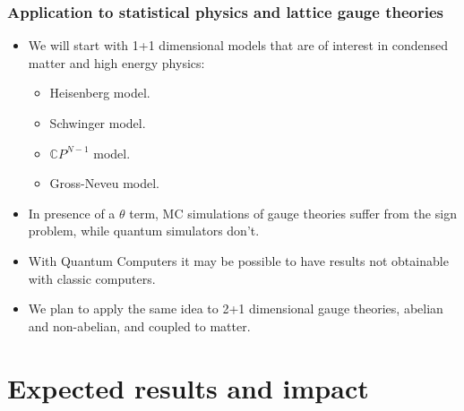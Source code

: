 \documentclass[10pt,t,xcolor=dvipsnames,aspectratio=169]{beamer}
\begin{document}
\begin{frame}
    \frametitle{Application to statistical physics and lattice gauge theories}
    \begin{itemize}
        \item
            We will start with 1+1 dimensional models that are of interest in condensed matter and high energy physics:
            \begin{itemize}
                \item Heisenberg model.
                \item Schwinger model.
                \item $\mathbb CP^{N-1}$ model.
                \item Gross-Neveu model.
            \end{itemize}
        \item
            In presence of a $\theta$ term, MC simulations of gauge theories suffer from the sign problem, while quantum simulators don't.
        \item
            With Quantum Computers it may be possible to have results not obtainable with classic computers.
        \item
            We plan to apply the same idea to 2+1 dimensional gauge theories, abelian and non-abelian, and coupled to matter.
    \end{itemize}
\end{frame}


\section{Expected results and impact}
\end{document}
